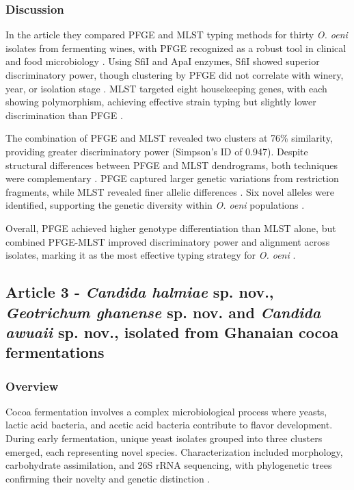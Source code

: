 \subsubsection*{Discussion}
In the article they compared PFGE and MLST typing methods for thirty \textit{O. oeni} isolates from fermenting wines, with PFGE recognized as a robust tool in clinical and food microbiology \cite*{L4-MST+PFGE}. Using SfiI and ApaI enzymes, SfiI showed superior discriminatory power, though clustering by PFGE did not correlate with winery, year, or isolation stage \cite*{L4-MST+PFGE}. MLST targeted eight housekeeping genes, with each showing polymorphism, achieving effective strain typing but slightly lower discrimination than PFGE \cite*{L4-MST+PFGE}.

The combination of PFGE and MLST revealed two clusters at 76\% similarity, providing greater discriminatory power (Simpson's ID of 0.947). Despite structural differences between PFGE and MLST dendrograms, both techniques were complementary \cite*{L4-MST+PFGE}. PFGE captured larger genetic variations from restriction fragments, while MLST revealed finer allelic differences \cite*{L4-MST+PFGE}. Six novel alleles were identified, supporting the genetic diversity within \textit{O. oeni} populations \cite*{L4-MST+PFGE}.

Overall, PFGE achieved higher genotype differentiation than MLST alone, but combined PFGE-MLST improved discriminatory power and alignment across isolates, marking it as the most effective typing strategy for \textit{O. oeni} \cite*{L4-MST+PFGE}.

\subsection{Article 3 - \textit{Candida halmiae} sp. nov., \textit{Geotrichum ghanense} sp. nov. and \textit{Candida awuaii} sp. nov., isolated from Ghanaian cocoa fermentations}
\subsubsection*{Overview}
Cocoa fermentation involves a complex microbiological process where yeasts, lactic acid bacteria, and acetic acid bacteria contribute to flavor development. During early fermentation, unique yeast isolates grouped into three clusters emerged, each representing novel species. Characterization included morphology, carbohydrate assimilation, and 26S rRNA sequencing, with phylogenetic trees confirming their novelty and genetic distinction  \cite*{L4-NewYeast}.
